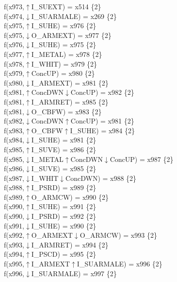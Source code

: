 f(x973,$\uparrow$I\_SUEXT) = x514 \{2\} \\  
f(x974,$\downarrow$I\_SUARMALE) = x269 \{2\} \\  
f(x975,$\uparrow$I\_SUHE) = x976 \{2\} \\  
f(x975,$\downarrow$O\_ARMEXT) = x977 \{2\} \\  
f(x976,$\downarrow$I\_SUHE) = x975 \{2\} \\  
f(x977,$\uparrow$I\_METAL) = x978 \{2\} \\  
f(x978,$\uparrow$I\_WHIT) = x979 \{2\} \\  
f(x979,$\uparrow$ConcUP) = x980 \{2\} \\  
f(x980,$\downarrow$I\_ARMEXT) = x981 \{2\} \\  
f(x981,$\uparrow$ConcDWN$\downarrow$ConcUP) = x982 \{2\} \\  
f(x981,$\uparrow$I\_ARMRET) = x985 \{2\} \\  
f(x981,$\downarrow$O\_CBFW) = x983 \{2\} \\  
f(x982,$\downarrow$ConcDWN$\uparrow$ConcUP) = x981 \{2\} \\  
f(x983,$\uparrow$O\_CBFW$\uparrow$I\_SUHE) = x984 \{2\} \\  
f(x984,$\downarrow$I\_SUHE) = x981 \{2\} \\  
f(x985,$\uparrow$I\_SUVE) = x986 \{2\} \\  
f(x985,$\downarrow$I\_METAL$\uparrow$ConcDWN$\downarrow$ConcUP) = x987 \{2\} \\  
f(x986,$\downarrow$I\_SUVE) = x985 \{2\} \\  
f(x987,$\downarrow$I\_WHIT$\downarrow$ConcDWN) = x988 \{2\} \\  
f(x988,$\uparrow$I\_PSRD) = x989 \{2\} \\  
f(x989,$\uparrow$O\_ARMCW) = x990 \{2\} \\  
f(x990,$\uparrow$I\_SUHE) = x991 \{2\} \\  
f(x990,$\downarrow$I\_PSRD) = x992 \{2\} \\  
f(x991,$\downarrow$I\_SUHE) = x990 \{2\} \\  
f(x992,$\uparrow$O\_ARMEXT$\downarrow$O\_ARMCW) = x993 \{2\} \\  
f(x993,$\downarrow$I\_ARMRET) = x994 \{2\} \\  
f(x994,$\uparrow$I\_PSCD) = x995 \{2\} \\  
f(x995,$\uparrow$I\_ARMEXT$\uparrow$I\_SUARMALE) = x996 \{2\} \\  
f(x996,$\downarrow$I\_SUARMALE) = x997 \{2\} \\  
